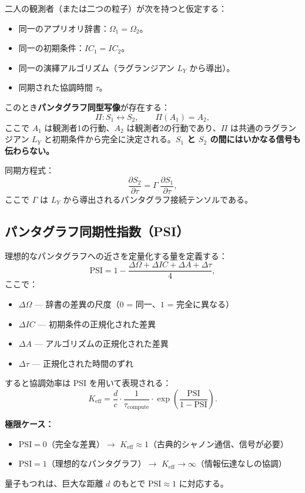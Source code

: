 \documentclass[12pt,a4paper]{article}
\begin{document}
	二人の観測者（または二つの粒子）が次を持つと仮定する：
	\begin{itemize}
		\item 同一のアプリオリ辞書：\(\Omega_1 = \Omega_2\)。
		\item 同一の初期条件：\(IC_1 = IC_2\)。
		\item 同一の演繹アルゴリズム（ラグランジアン \(L_Y\) から導出）。
		\item 同期された協調時間 \(\tau\)。
	\end{itemize}
	
	このとき\textbf{パンタグラフ同型写像}が存在する：
	\[
	\Pi: S_1 \leftrightarrow S_2, \qquad \Pi(A_1) = A_2,
	\]
	ここで \(A_1\) は観測者1の行動、\(A_2\) は観測者2の行動であり、\(\Pi\) は共通のラグランジアン \(L_Y\) と初期条件から完全に決定される。\textbf{\(S_1\) と \(S_2\) の間にはいかなる信号も伝わらない。}
	
	同期方程式：
	\[
	\frac{\partial S_2}{\partial \tau} = \Gamma \; \frac{\partial S_1}{\partial \tau},
	\]
	ここで \(\Gamma\) は \(L_Y\) から導出されるパンタグラフ接続テンソルである。
	
	\subsection{パンタグラフ同期性指数（PSI）}
	
	理想的なパンタグラフへの近さを定量化する量を定義する：
	\[
	\mathrm{PSI} = 1 - \frac{\Delta\Omega + \Delta IC + \Delta A + \Delta\tau}{4},
	\]
	ここで：
	\begin{itemize}
		\item \(\Delta\Omega\) — 辞書の差異の尺度（\(0\) = 同一、\(1\) = 完全に異なる）
		\item \(\Delta IC\) — 初期条件の正規化された差異
		\item \(\Delta A\) — アルゴリズムの正規化された差異
		\item \(\Delta\tau\) — 正規化された時間のずれ
	\end{itemize}
	
	すると協調効率は PSI を用いて表現される：
	\[
	K_{\mathrm{eff}} = \frac{d}{c} \cdot \frac{1}{\tau_{\mathrm{compute}}} \cdot \exp\!\left( \frac{\mathrm{PSI}}{1 - \mathrm{PSI}} \right).
	\]
	
	\textbf{極限ケース：}
	\begin{itemize}
		\item \(\mathrm{PSI} = 0\)（完全な差異）\(\to\) \(K_{\mathrm{eff}} \approx 1\)（古典的シャノン通信、信号が必要）
		\item \(\mathrm{PSI} = 1\)（理想的なパンタグラフ）\(\to\) \(K_{\mathrm{eff}} \to \infty\)（情報伝達なしの協調）
	\end{itemize}
	量子もつれは、巨大な距離 \(d\) のもとで \(\mathrm{PSI} \approx 1\) に対応する。
	
\end{document}
